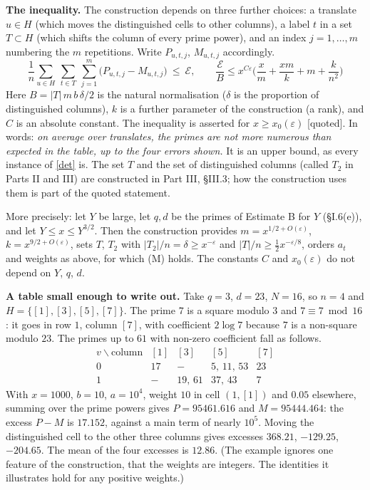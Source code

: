 \documentclass[11pt,letterpaper]{article}
\newcommand{\quoted}{\textsf{[quoted]}}
\begin{document}
\textbf{The inequality.} The construction depends on three further choices: a translate $u\in H$ (which
moves the distinguished cells to other columns), a label $t$ in a set $T\subset H$ (which shifts the column
of every prime power), and an index $j=1,\dots,m$ numbering the $m$ repetitions. Write $P_{u,t,j}$,
$M_{u,t,j}$ accordingly.
\begin{equation}\label{D:26}\tag{M}
 \boxed{\ \frac1n\sum_{u\in H}\ \sum_{t\in T}\ \sum_{j=1}^m\big(P_{u,t,j}-M_{u,t,j}\big)\ \le\ \mathcal E,
 \qquad \frac{\mathcal E}{B}\le x^{C\varepsilon}\Big(\frac xm+\frac{xm}{k}+m+\frac k{n^2}\Big)\ }
\end{equation}
Here $B=|T|\,m\,b\,\delta/2$ is the natural normalisation ($\delta$ is the proportion of distinguished
columns), $k$ is a further parameter of the construction (a rank), and $C$ is an absolute constant. The
inequality is asserted for $x\ge x_0(\varepsilon)$ \quoted.
In words: \emph{on average over translates, the primes are not more numerous than expected in the
table, up to the four errors shown.} It is an upper bound, as every instance of \eqref{det} is.
The set $T$ and the set of distinguished columns (called $T_2$ in Parts II and III) are constructed in
Part III, \S III.3; how the construction uses them is part of the quoted statement.

More precisely: let $Y$ be large, let $q,d$ be the primes of Estimate B for $Y$ (\S I.6(e)), and let
$Y\le x\le Y^{3/2}$. Then the construction provides $m=x^{1/2+O(\varepsilon)}$, $k=x^{9/2+O(\varepsilon)}$,
sets $T$, $T_2$ with $|T_2|/n=\delta\ge x^{-\varepsilon}$ and $|T|/n\ge\frac12x^{-\varepsilon/8}$, orders $a_t$
and weights as above, for which (M) holds. The constants $C$ and $x_0(\varepsilon)$ do not depend on $Y$,
$q$, $d$.

\textbf{A table small enough to write out.} Take $q=3$, $d=23$, $N=16$, so $n=4$ and
$H=\{[1],[3],[5],[7]\}$. The prime $7$ is a square modulo $3$ and $7\equiv7\bmod16$: it goes in row $1$,
column $[7]$, with coefficient $2\log7$ because $7$ is a non-square modulo $23$. The primes up to $61$ with
non-zero coefficient fall as follows.
\begin{equation}\label{D:27}
 \begin{array}{c|cccc}
 v\backslash\text{column} &[1]&[3]&[5]&[7]\\ \hline
 0&17& - &5,\,11,\,53&23\\
 1& -&19,\,61&37,\,43&7
 \end{array}
\end{equation}
With $x=1000$, $b=10$, $a=10^4$, weight $10$ in cell $(1,[1])$ and $0.05$ elsewhere, summing over the prime powers
gives $P=95461.616$ and $M=95444.464$: the excess $P-M$ is $17.152$, against a main term of nearly $10^5$.
Moving the distinguished cell to the other three columns gives excesses $368.21$, $-129.25$, $-204.65$.
The mean of the four excesses is $12.86$. (The example ignores one feature of the construction, that the weights are
integers. The identities it illustrates hold for any positive weights.)
\end{document}

